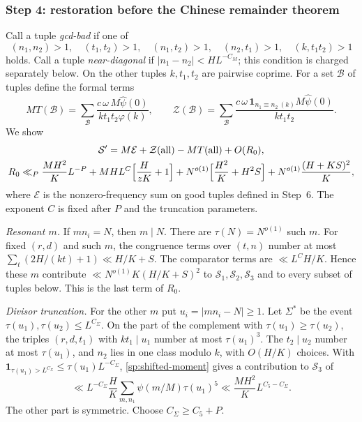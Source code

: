 \subsubsection*{Step 4: restoration before the Chinese remainder theorem}
Call a tuple \emph{gcd-bad} if one of
\begin{equation}\label{sp:bad}
 (n_1,n_2)>1,\quad(t_1,t_2)>1,\quad(n_1,t_2)>1,\quad(n_2,t_1)>1,\quad(k,t_1t_2)>1
\end{equation}
 holds. Call a tuple \emph{near-diagonal} if
$|n_1-n_2|<HL^{-C_M}$; this condition is charged separately below. On the
other tuples $k,t_1,t_2$ are pairwise coprime. For a set $\mathcal B$ of
tuples define the formal terms
\begin{equation}\label{sp:formal}
 MT(\mathcal B)=\sum_{\mathcal B}\frac{c\,\omega\,M\hat\psi(0)}{kt_1t_2\varphi(k)},\qquad
 \mathcal Z(\mathcal B)=\sum_{\mathcal B}\frac{c\,\omega\,\mathbf1_{n_1\equiv n_2\ (k)}M\hat\psi(0)}{kt_1t_2}.
\end{equation}
We show
\begin{equation}\label{sp:restoration}
\begin{gathered}
 \mathcal S'=M\mathcal E+\mathcal Z(\mathrm{all})-MT(\mathrm{all})+O(R_0),\\
 R_0\ll_P\frac{MH^2}KL^{-P}+MHL^{C}\Bigl[\frac H{zK}+1\Bigr]
   +N^{o(1)}\Bigl[\frac{H^2}K+H^2S\Bigr]+N^{o(1)}\frac{(H+KS)^2}K ,
\end{gathered}
\end{equation}
where $\mathcal E$ is the nonzero-frequency sum on good tuples defined in
Step~6. The exponent $C$ is fixed after $P$ and the truncation parameters.

\emph{Resonant $m$.} If $mn_i=N$, then $m\mid N$. There are
$\tau(N)=N^{o(1)}$ such $m$. For fixed $(r,d)$ and such $m$, the
congruence terms over $(t,n)$ number at most $\sum_t(2H/(kt)+1)\ll H/K+S$.
The comparator terms are $\ll L^{C}H/K$. Hence these $m$ contribute
$\ll N^{o(1)}K(H/K+S)^2$ to $\mathcal S_1,\mathcal S_2,\mathcal S_3$ and to every subset of
tuples below. This is the last term of $R_0$.

\emph{Divisor truncation.} For the other $m$ put $u_i=|mn_i-N|\ge1$. Let
$\Sigma^*$ be the event $\tau(u_1),\tau(u_2)\le L^{C_\Sigma}$. On the part of
the complement with $\tau(u_1)\ge\tau(u_2)$, the triples $(r,d,t_1)$ with
$kt_1\mid u_1$ number at most $\tau(u_1)^3$. The $t_2\mid u_2$ number at
most $\tau(u_1)$, and $n_2$ lies in one class modulo $k$, with $O(H/K)$
choices. With $\mathbf1_{\tau(u_1)>L^{C_\Sigma}}\le\tau(u_1)L^{-C_\Sigma}$,
\eqref{sp:shifted-moment} gives a contribution to $\mathcal S_3$ of
\begin{equation}\label{sp:trunc}
 \ll L^{-C_\Sigma}\frac HK\sum_{m,n_1}\psi(m/M)\tau(u_1)^5\ll\frac{MH^2}KL^{C_5-C_\Sigma}.
\end{equation}
The other part is symmetric. Choose $C_\Sigma\ge C_5+P$.

